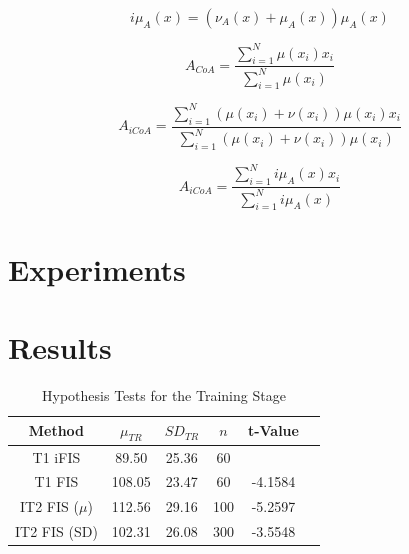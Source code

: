 \documentclass[conference]{IEEEtran}
\begin{document}
\begin{equation}
  i\mu_{A}(x) = (\nu_{A}(x) + \mu_{A}(x))\mu_{A}(x)
\end{equation}

\begin{equation}
  A_{CoA} = \dfrac{\sum_{i=1}^{N} \mu(x_{i})
    x_{i}}{\sum_{i=1}^{N} \mu(x_{i})}
\end{equation}

\begin{equation}
  A_{iCoA} = \dfrac{\sum_{i=1}^{N} (\mu(x_{i}) + \nu(x_{i})) \mu(x_{i})
    x_{i}}{\sum_{i=1}^{N} (\mu(x_{i}) + \nu(x_{i})) \mu(x_{i})}
\end{equation}

\begin{equation}
  A_{iCoA} = \dfrac{\sum_{i=1}^{N} i\mu_{A}(x) x_{i}}{\sum_{i=1}^{N}
    i\mu_{A}(x)}
\end{equation}

\section{Experiments}


\section{Results}

\begin{table}[!t]
  \renewcommand{\arraystretch}{1.3}
  \caption{Hypothesis Tests for the Training Stage}
  \label{hypothesis-tests-training}
  \centering
  \begin{tabular}{|c|c|c|c|c|c|}
    \hline
    Method & $\mu_{TR}$ & $SD_{TR}$ & $n$ & t-Value\\
    \hline
    T1 iFIS & 89.50 & 25.36 & 60 & \\
    \hline
    T1 FIS & 108.05 & 23.47 & 60 & -4.1584 \\
    \hline
    IT2 FIS (\(\mu\)) & 112.56 & 29.16 & 100 & -5.2597 \\
    \hline
    IT2 FIS (SD) & 102.31 & 26.08 & 300 & -3.5548 \\
    \hline
  \end{tabular}
\end{table}
\end{document}
